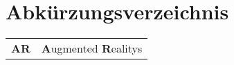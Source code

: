 \chapter{Abkürzungsverzeichnis}

\begin{center}
\begin{tabular}{rl}
\textbf{AR} & \textbf{A}ugmented \textbf{R}ealitys \\ 
\end{tabular}
\end{center}
 
